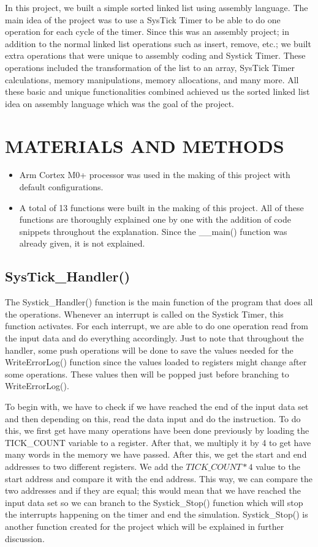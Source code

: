 \documentclass[pdftex,12pt,a4paper]{article}
\begin{document}
In this project, we built a simple sorted linked list using assembly language. The main idea of the project was to use a SysTick Timer to be able to do one operation for each cycle of the timer. Since this was an assembly project; in addition to the normal linked list operations such as insert, remove, etc.; we built extra operations that were unique to assembly coding and Systick Timer. These operations included the transformation of the list to an array, SysTick Timer calculations, memory manipulations, memory allocations, and many more. All these basic and unique functionalities combined achieved us the sorted linked list idea on assembly language which was the goal of the project.

\section{MATERIALS AND METHODS}

\begin{itemize}
	\item Arm Cortex M0+ processor was used in the making of this project with default configurations.
	\item A total of 13 functions were built in the making of this project. All of these functions are thoroughly explained one by one with the addition of code snippets throughout the explanation. Since the \_\_main() function was already given, it is not explained.
\end{itemize} 



\subsection{SysTick\_Handler()}

The Systick\_Handler() function is the main function of the program that does all the operations. Whenever an interrupt is called on the Systick Timer, this function activates. For each interrupt, we are able to do one operation read from the input data and do everything accordingly. Just to note that throughout the handler, some push operations will be done to save the values needed for the WriteErrorLog() function since the values loaded to registers might change after some operations. These values then will be popped just before branching to WriteErrorLog().

To begin with, we have to check if we have reached the end of the input data set and then depending on this, read the data input and do the instruction. To do this, we first get have many operations have been done previously by loading the TICK\_COUNT variable to a register. After that, we multiply it by 4 to get have many words in the memory we have passed. After this, we get the start and end addresses to two different registers. We add the $TICK\_COUNT*4$ value to the start address and compare it with the end address. This way, we can compare the two addresses and if they are equal; this would mean that we have reached the input data set so we can branch to the Systick\_Stop() function which will stop the interrupts happening on the timer and end the simulation. Systick\_Stop() is another function created for the project which will be explained in further discussion. 
\end{document}
